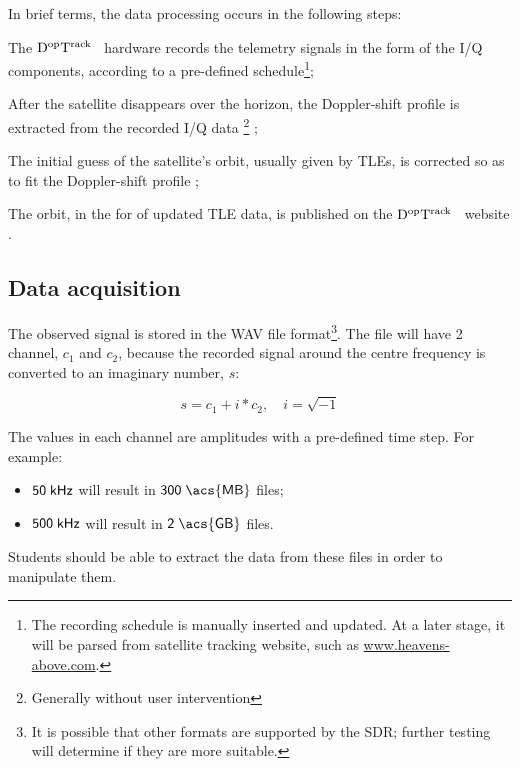 \documentclass[11pt,a4paper,oneside]{article}
\newcommand{\GroundStationName}{${\rm D^{\rm op}T^{\rm rack}}$}
\newcommand{\listskip}{0pt}
\newenvironment{itemize*}
{\begin{itemize}
  \setlength{\itemsep}{\listskip}
  \setlength{\parskip}{\listskip}
  \setlength{\parsep}{\listskip}}
{\end{itemize}}
\newcommand{\footnoteremember}[2]{%
  \footnote{#2}%
  \newcounter{#1}%
  \setcounter{#1}{\value{footnote}}%
}
\newcommand{\footnoterecall}[1]{%
  \footnotemark[\value{#1}]%
}
\newcommand{\unit}[2]{$ {\sf #1}\thickspace{\sf #2}$}
\begin{document}
In brief terms, the data processing occurs in the following steps:

\begin{itemize*}
\item The \GroundStationName~ hardware records the telemetry signals in the form of the \ac{I/Q} components, according to a pre-defined schedule\footnote{The recording schedule is manually inserted and updated. At a later stage, it will be parsed from satellite tracking website, such as \url{www.heavens-above.com}.};
\item After the satellite disappears over the horizon, the Doppler-shift profile is extracted from the recorded \ac{I/Q} data\footnoteremember{nouserinterv}{Generally without user intervention};
\item The initial guess of the satellite's orbit, usually given by \acp{TLE}, is corrected so as to fit the Doppler-shift profile\footnoterecall{nouserinterv};
\item The orbit, in the for of updated \ac{TLE} data, is published on the \GroundStationName~ website\footnoterecall{nouserinterv}.
\end{itemize*}



\subsection{Data acquisition}

The observed signal is stored in the \ac{WAV} file format\footnote{It is possible that other formats are supported by the \ac{SDR}; further testing will determine if they are more suitable.}. The file will have 2 channel, $c_1$ and $c_2$, because the recorded signal around the centre frequency is converted to an imaginary number, $s$:

\begin{equation}
s = c_1 + i*c_2, \quad i=\sqrt{-1}
\end{equation}

The values in each channel are amplitudes with a pre-defined time step. For example:

\begin{itemize}
\item \unit{50}{kHz} will result in \unit{300}{\acs{MB}} files;
\item \unit{500}{kHz} will result in \unit{2}{\acs{GB}} files.
\end{itemize}

Students should be able to extract the data from these files in order to manipulate them.
\end{document}
